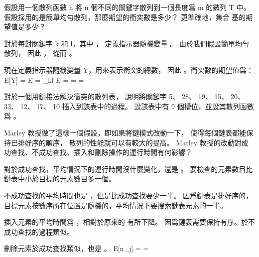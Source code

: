 \startsection[
  title={Hash tables},
]
\startEXERCISE
假設用一個散列函數 h 將 n 個不同的關鍵字散列到一個長度爲 m 的數列 T 中。
假設採用的是簡單均勻散列，那麼期望的衝突數是多少？
更準確地，集合  基的期望值是多少？
\stopEXERCISE

\startANSWER
對於每對關鍵字 k 和 l，其中 ，
定義指示器隨機變量 。
由於我們假設簡單均勻散列，
因此 ，
從而 。

現在定義指示器隨機變量 Y，用來表示衝突的總數，
因此 。衝突數的期望值爲：
\startformula\startmathalignment
\NC E[Y]
    \NC = E \NR
\NC \NC = \sum_{k\ne l} E\left[ X_{kl} \right] \NR
\NC \NC =  \NR
\NC \NC = \times {} \NR
\NC \NC =  \NR
\stopmathalignment\stopformula
\stopANSWER

\startEXERCISE
對於一個用鏈接法解決衝突的散列表，
說明將關鍵字 5、 28、 19、 15、 20、 33、 12、 17、 10 插入到該表中的過程。
設該表中有 9 個槽位，並設其散列函數爲 。
\stopEXERCISE

\startANSWER
{}
\stopANSWER

\startEXERCISE
Marley 教授做了這樣一個假設，即如果將鏈模式改動一下，
使得每個鏈表都能保持已排好序的順序，
散列的性能就可以有較大的提高。
 Marley 教授的改動對成功查找、不成功查找、插入和刪除操作的運行時間有何影響？
\stopEXERCISE

\startANSWER
對於成功查找，平均情況下的運行時間沒什麼變化，還是 。
要檢查的元素數目比鏈表中小於目標的元素數目多一個。

不成功查找的平均時間也是 ，但是比成功查找要少一半。
因爲鏈表是排好序的，目標元素按數序所在位置是隨機的，平均情況下要搜索鏈表元素的一半。

插入元素的平均時間爲 ，相對於原來的  有所下降。
因爲鏈表需要保持有序。於不成功查找的過程類似。

刪除元素於成功查找類似，也是 。
\startformula
E[n_j] = \alpha = 
\stopformula
\stopANSWER

